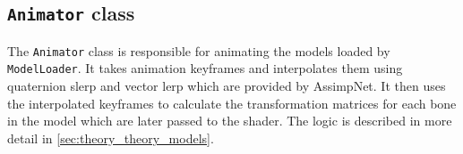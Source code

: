\subsection{\texttt{Animator} class}\label{subsec:animator-class}

The \texttt{Animator} class is responsible for animating the models loaded by \texttt{ModelLoader}.
It takes animation keyframes and interpolates them using quaternion slerp and vector lerp which are provided by AssimpNet.
It then uses the interpolated keyframes to calculate the transformation matrices for each bone in the model which are later passed to the shader.
The logic is described in more detail in \autoref{sec:theory_theory_models}.